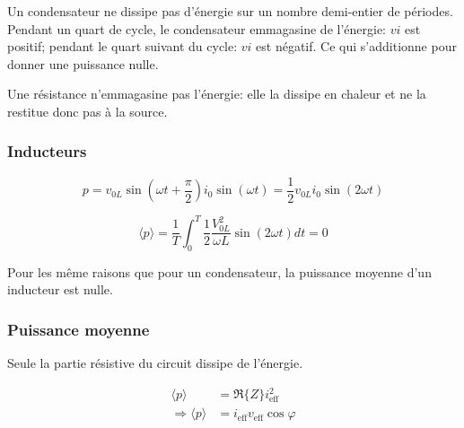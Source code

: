 \begin{multicols*}{2}
    Un condensateur ne dissipe pas d'énergie sur un nombre demi-entier de périodes. Pendant un quart de cycle, le condensateur emmagasine de l'énergie: $vi$ est positif; pendant le quart suivant du cycle: $vi$ est négatif. Ce qui s'additionne pour donner une puissance nulle.
    
    Une résistance n'emmagasine pas l'énergie: elle la dissipe en chaleur et ne la restitue donc pas à la source.
    
    \begin{center}
    \end{center}
    
    \subsubsection{Inducteurs}
    \[ p = v_{0L} \sin(\omega t + \frac{\pi}{2}) i_0 \sin(\omega t) = \frac{1}{2} v_{0L} i_0 \sin(2\omega t) \]
    
    \[ \langle p \rangle = \frac{1}{T} \int_0^T \frac{1}{2} \frac{V_{0L}^2}{\omega L}\sin(2\omega t) dt = 0 \]
    
    Pour les même raisons que pour un condensateur, la puissance moyenne d'un inducteur est nulle.
    
    \begin{center}
    \end{center}
    
    \subsubsection{Puissance moyenne}
    
    Seule la partie résistive du circuit dissipe de l'énergie.
    
    \begin{align*}
        \langle p \rangle &= \Re \{Z\} i^2_{\text{eff}} \\
        \Rightarrow \langle p \rangle &= i_{\text{eff}}v_{\text{eff}} \cos\varphi
    \end{align*}
    

\end{multicols*}
